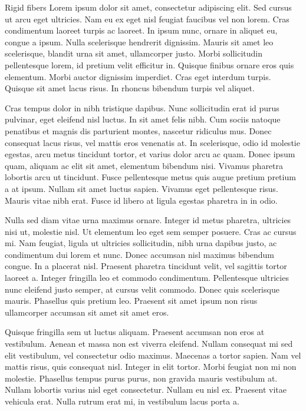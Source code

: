 \documentclass[a4paper,11pt]{kth-mag}
\begin{document}
Rigid fibers Lorem ipsum dolor sit amet, consectetur adipiscing elit. Sed cursus ut arcu eget ultricies. Nam eu ex eget nisl feugiat faucibus vel non lorem. Cras condimentum laoreet turpis ac laoreet. In ipsum nunc, ornare in aliquet eu, congue a ipsum. Nulla scelerisque hendrerit dignissim. Mauris sit amet leo scelerisque, blandit urna sit amet, ullamcorper justo. Morbi sollicitudin pellentesque lorem, id pretium velit efficitur in. Quisque finibus ornare eros quis elementum. Morbi auctor dignissim imperdiet. Cras eget interdum turpis. Quisque sit amet lacus risus. In rhoncus bibendum turpis vel aliquet.

Cras tempus dolor in nibh tristique dapibus. Nunc sollicitudin erat id purus pulvinar, eget eleifend nisl luctus. In sit amet felis nibh. Cum sociis natoque penatibus et magnis dis parturient montes, nascetur ridiculus mus. Donec consequat lacus risus, vel mattis eros venenatis at. In scelerisque, odio id molestie egestas, arcu metus tincidunt tortor, et varius dolor arcu ac quam. Donec ipsum quam, aliquam ac elit sit amet, elementum bibendum nisi. Vivamus pharetra lobortis arcu ut tincidunt. Fusce pellentesque metus quis augue pretium pretium a at ipsum. Nullam sit amet luctus sapien. Vivamus eget pellentesque risus. Mauris vitae nibh erat. Fusce id libero at ligula egestas pharetra in in odio.

Nulla sed diam vitae urna maximus ornare. Integer id metus pharetra, ultricies nisi ut, molestie nisl. Ut elementum leo eget sem semper posuere. Cras ac cursus mi. Nam feugiat, ligula ut ultricies sollicitudin, nibh urna dapibus justo, ac condimentum dui lorem et nunc. Donec accumsan nisl maximus bibendum congue. In a placerat nisl. Praesent pharetra tincidunt velit, vel sagittis tortor laoreet a. Integer fringilla leo et commodo condimentum. Pellentesque ultricies nunc eleifend justo semper, at cursus velit commodo. Donec quis scelerisque mauris. Phasellus quis pretium leo. Praesent sit amet ipsum non risus ullamcorper accumsan sit amet sit amet eros.

Quisque fringilla sem ut luctus aliquam. Praesent accumsan non eros at vestibulum. Aenean et massa non est viverra eleifend. Nullam consequat mi sed elit vestibulum, vel consectetur odio maximus. Maecenas a tortor sapien. Nam vel mattis risus, quis consequat nisl. Integer in elit tortor. Morbi feugiat non mi non molestie. Phasellus tempus purus purus, non gravida mauris vestibulum at. Nullam lobortis varius nisl eget consectetur. Nullam eu nisl ex. Praesent vitae vehicula erat. Nulla rutrum erat mi, in vestibulum lacus porta a.
\end{document}
